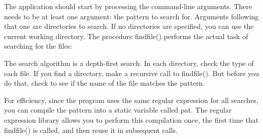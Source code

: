 The application should start by processing the
command-line arguments. There needs to be at least
one argument: the pattern to search for. Arguments following that one
are directories to search. If no directories are specified, you can use
the current working directory. The procedure
\textsf{findfile()} performs the actual task of searching for the
files: 


The search algorithm is a depth-first search. In each directory, check
the type of each file. If you find a directory, make a recursive call
to \textsf{findfile()}. But before you do that, check to see if the
name of the file matches the pattern. 

For efficiency, since the program uses the same regular expression for
all searches, you can compile the pattern into a static variable called
\textsf{pat}. The regular expression library allows you to perform this
compilation once, the first time that \textsf{findfile()} is called,
and then reuse it in subsequent calls.


